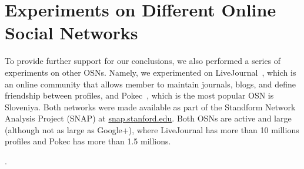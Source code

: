 \documentclass[journal]{IEEEtran}
\begin{document}


\section{Experiments on Different Online Social Networks}
\label{sec:otherNetworks}
To provide further support for our conclusions, we also performed a series of experiments on other OSNs. Namely, we experimented on LiveJournal~\cite{backstrom2006groupFormation,leskovec2009community}, which is an online community that allows member to maintain journals, blogs, and define friendship between profiles, and Pokec~\cite{takac2012data}, which is the most popular OSN is Sloveniya. Both networks were made available as part of the Standform Network Analysis Project (SNAP) at \url{snap.stanford.edu}. Both OSNs are active and large (although not as large as Google+), where LiveJournal has more than 10 millions profiles and Pokec has more than 1.5 millions. 




. %
\end{document}
